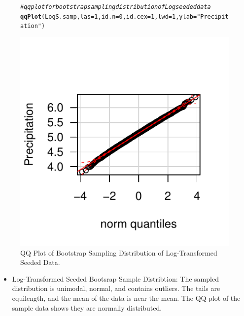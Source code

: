 \documentclass{article}\usepackage[]{graphicx}\usepackage[]{color}
\makeatletter
\def\maxwidth{ %
  \ifdim\Gin@nat@width>\linewidth
    \linewidth
  \else
    \Gin@nat@width
  \fi
}
\newcommand{\hlnum}[1]{\textcolor[rgb]{0.686,0.059,0.569}{#1}}%
\newcommand{\hlstr}[1]{\textcolor[rgb]{0.192,0.494,0.8}{#1}}%
\newcommand{\hlcom}[1]{\textcolor[rgb]{0.678,0.584,0.686}{\textit{#1}}}%
\newcommand{\hlstd}[1]{\textcolor[rgb]{0.345,0.345,0.345}{#1}}%
\newcommand{\hlkwc}[1]{\textcolor[rgb]{0.333,0.667,0.333}{#1}}%
\newcommand{\hlkwd}[1]{\textcolor[rgb]{0.737,0.353,0.396}{\textbf{#1}}}%
\newenvironment{kframe}{%
 \def\at@end@of@kframe{}%
 \ifinner\ifhmode%
  \def\at@end@of@kframe{\end{minipage}}%
  \begin{minipage}{\columnwidth}%
 \fi\fi%
 \def\FrameCommand##1{\hskip\@totalleftmargin \hskip-\fboxsep
 \colorbox{shadecolor}{##1}\hskip-\fboxsep
     \hskip-\linewidth \hskip-\@totalleftmargin \hskip\columnwidth}%
 \MakeFramed {\advance\hsize-\width
   \@totalleftmargin\z@ \linewidth\hsize
   \@setminipage}}%
 {\par\unskip\endMakeFramed%
 \at@end@of@kframe}
\newenvironment{knitrout}{}{} %
\makeatother
\begin{document}
\begin{figure}[H]  \begin{center}
\begin{knitrout}
\color{fgcolor}\begin{kframe}
\begin{alltt}
\hlcom{# qq plot for bootstrap sampling distribution of Log seeded data}
\hlkwd{qqPlot}\hlstd{(LogS.samp,} \hlkwc{las} \hlstd{=} \hlnum{1}\hlstd{,} \hlkwc{id.n} \hlstd{=} \hlnum{0}\hlstd{,} \hlkwc{id.cex} \hlstd{=} \hlnum{1}\hlstd{,} \hlkwc{lwd} \hlstd{=} \hlnum{1}\hlstd{,} \hlkwc{ylab} \hlstd{=} \hlstr{"Precipitation"}\hlstd{)}
\end{alltt}
\end{kframe}
\includegraphics[width=\maxwidth]{figure/1a_qq_LogSsamp} 

\end{knitrout}
\end{center} \caption{QQ Plot of Bootstrap Sampling Distribution of Log-Transformed Seeded Data.} \end{figure}

\begin{itemize}
\item Log-Transformed Seeded Bootsrap Sample Distribtion:  The sampled distribution is unimodal, normal, and contains outliers.  The tails are equilength, and the mean of the data is near the mean.  The QQ plot of the sample data shows they are normally distributed.
\end{itemize}
\end{document}
